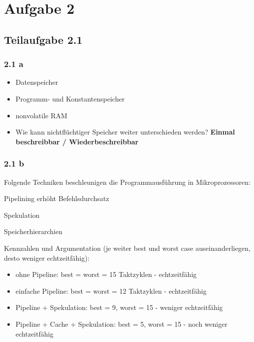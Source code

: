 \documentclass[a4paper]{scrartcl}
\begin{document}
  \section*{Aufgabe 2}
  \subsection*{Teilaufgabe 2.1}
  \subsubsection*{2.1 a}
  \begin{itemize}
      \item Datenspeicher
      \item Programm- und Konstantenspeicher
      \item nonvolatile RAM            
      \item Wie kann nichtflüchtiger Speicher weiter unterschieden werden?
            \textbf{Einmal beschreibbar / Wiederbeschreibbar}
  \end{itemize}

  \subsubsection*{2.1 b}
  Folgende Techniken beschleunigen die Programmausführung in Mikroprozessoren:
  \begin{enumerate*}[label=(\arabic*)]
      \item Pipelining erhöht Befehlsdurchsatz
      \item Spekulation
      \item Speicherhierarchien
  \end{enumerate*}
  
  Kennzahlen und Argumentation (je weiter best und worst case auseinanderliegen, desto weniger echtzeitfähig):
  \begin{itemize}
  	\item ohne Pipeline: best = worst = 15 Taktzyklen - echtzeitfähig
	\item einfache Pipeline: best = worst = 12 Taktzyklen - echtzeitfähig
	\item Pipeline + Spekulation: best = 9, worst = 15 - weniger echtzeitfähig
	\item Pipeline + Cache + Spekulation: best = 5, worst = 15 - noch weniger echtzeitfähig
  \end{itemize}
\end{document}
